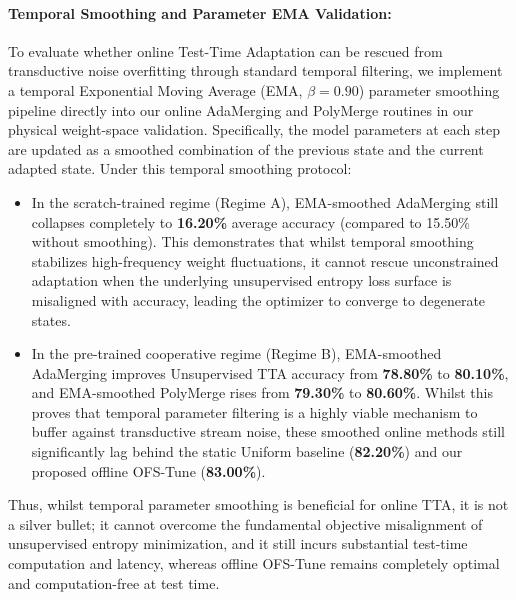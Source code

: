\paragraph{Temporal Smoothing and Parameter EMA Validation:} 
To evaluate whether online Test-Time Adaptation can be rescued from transductive noise overfitting through standard temporal filtering, we implement a temporal Exponential Moving Average (EMA, $\beta=0.90$) parameter smoothing pipeline directly into our online AdaMerging and PolyMerge routines in our physical weight-space validation.
Specifically, the model parameters at each step are updated as a smoothed combination of the previous state and the current adapted state.
Under this temporal smoothing protocol:
\begin{itemize}
    \item In the scratch-trained regime (Regime A), EMA-smoothed AdaMerging still collapses completely to \textbf{16.20\%} average accuracy (compared to 15.50\% without smoothing).
This demonstrates that whilst temporal smoothing stabilizes high-frequency weight fluctuations, it cannot rescue unconstrained adaptation when the underlying unsupervised entropy loss surface is misaligned with accuracy, leading the optimizer to converge to degenerate states.
    \item In the pre-trained cooperative regime (Regime B), EMA-smoothed AdaMerging improves Unsupervised TTA accuracy from \textbf{78.80\%} to \textbf{80.10\%}, and EMA-smoothed PolyMerge rises from \textbf{79.30\%} to \textbf{80.60\%}.
Whilst this proves that temporal parameter filtering is a highly viable mechanism to buffer against transductive stream noise, these smoothed online methods still significantly lag behind the static Uniform baseline (\textbf{82.20\%}) and our proposed offline OFS-Tune (\textbf{83.00\%}). 
\end{itemize}
Thus, whilst temporal parameter smoothing is beneficial for online TTA, it is not a silver bullet; it cannot overcome the fundamental objective misalignment of unsupervised entropy minimization, and it still incurs substantial test-time computation and latency, whereas offline OFS-Tune remains completely optimal and computation-free at test time.


